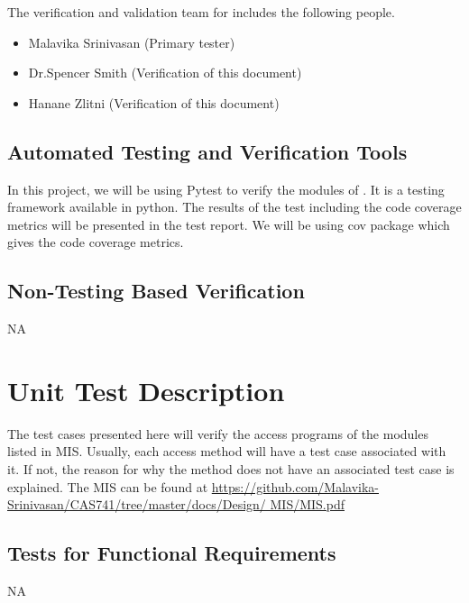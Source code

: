 \documentclass[12pt, titlepage]{article}
\begin{document}
The verification and validation team for \famname{} includes the following 
people.
\begin{itemize}
	\item Malavika Srinivasan (Primary tester)
	\item Dr.Spencer Smith (Verification of this document)
	\item Hanane Zlitni (Verification of this document)
\end{itemize}

\subsection{Automated Testing and Verification Tools}

In this project, we will be using Pytest to verify the modules of \famname{}. 
It is a testing framework available in python. The results of the test 
including the code coverage metrics will be presented in the test report. We 
will be using cov package which gives the code coverage metrics.



\subsection{Non-Testing Based Verification}

NA

\section{Unit Test Description}

The test cases presented here will verify the access programs of the modules 
listed in MIS. Usually, each access method will have a test case associated 
with it. If not, the reason for why the method does not have an associated test 
case is explained.
The MIS can be found at 
\url{https://github.com/Malavika-Srinivasan/CAS741/tree/master/docs/Design/
	MIS/MIS.pdf}




\subsection{Tests for Functional Requirements}

NA

\end{document}
